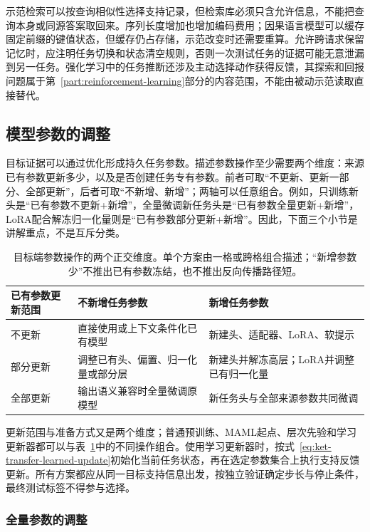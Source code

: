 示范检索可以按查询相似性选择支持记录，但检索库必须只含允许信息，不能把查询本身或同源答案取回来。序列长度增加也增加编码费用；因果语言模型可以缓存固定前缀的键值状态，但缓存仍占存储，示范改变时还需要重算。允许跨请求保留记忆时，应注明任务切换和状态清空规则，否则一次测试任务的证据可能无意泄漏到另一任务。强化学习中的任务推断还涉及主动选择动作获得反馈，其探索和回报问题属于第~\ref{part:reinforcement-learning}部分的内容范围，不能由被动示范读取直接替代。

\subsection{模型参数的调整}
\label{sec:ket-transfer-parameter-adaptation}

目标证据可以通过优化形成持久任务参数。描述参数操作至少需要两个维度：来源已有参数更新多少，以及是否创建任务专有参数。前者可取“不更新、更新一部分、全部更新”，后者可取“不新增、新增”；两轴可以任意组合。例如，只训练新头是“已有参数不更新+新增”，全量微调新任务头是“已有参数全量更新+新增”，LoRA配合解冻归一化量则是“已有参数部分更新+新增”。因此，下面三个小节是讲解重点，不是互斥分类。

\begin{table}[htbp]
  \centering
  \small
  \begin{tabularx}{\linewidth}{p{28mm}XX}
    \toprule
    已有参数更新范围 & 不新增任务参数 & 新增任务参数 \\
    \midrule
    不更新 & 直接使用或上下文条件化已有模型 & 新建头、适配器、LoRA、软提示 \\
    部分更新 & 调整已有头、偏置、归一化量或部分层 & 新建头并解冻高层；LoRA并调整已有归一化量 \\
    全部更新 & 输出语义兼容时全量微调原模型 & 新任务头与全部来源参数共同微调 \\
    \bottomrule
  \end{tabularx}
  \caption{目标端参数操作的两个正交维度。单个方案由一格或跨格组合描述；“新增参数少”不推出已有参数冻结，也不推出反向传播路径短。}
  \label{tab:ket-transfer-parameter-axes}
\end{table}

更新范围与准备方式又是两个维度；普通预训练、MAML起点、层次先验和学习更新器都可以与表~\ref{tab:ket-transfer-parameter-axes}中的不同操作组合。使用学习更新器时，按式~\eqref{eq:ket-transfer-learned-update}初始化当前任务状态，再在选定参数集合上执行支持反馈更新。所有方案都应从同一目标支持信息出发，按独立验证确定步长与停止条件，最终测试标签不得参与选择。

\subsubsection{全量参数的调整}
\label{sec:ket-transfer-full-finetuning}

